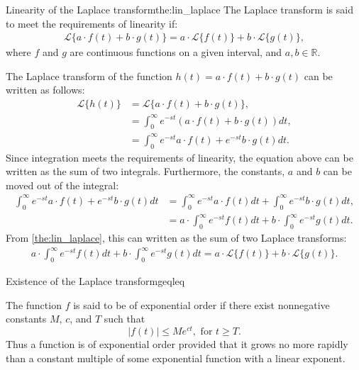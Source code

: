 \begin{theorem}{Linearity of the Laplace transform}{the:lin_laplace}
The Laplace transform is said to meet the requirements of linearity if:
\begin{align*}
\mathcal{L}\{a\cdot f(t)+b\cdot g(t)\}=a\cdot \mathcal{L}\{f(t)\}+b\cdot \mathcal{L}\{g(t)\},
\end{align*}
where $f$ and $g$ are continuous functions on a given interval, and $a, b \in \mathbb{R}$.
\end{theorem}
\begin{prof}{}{}
The Laplace transform of the function $h(t)=a\cdot f(t)+ b \cdot g(t)$ can be written as follows:
\begin{align*}
\mathcal{L}\{h(t)\}&=\mathcal{L}\{a\cdot f(t)+b\cdot g(t)\},
\\
&=\int_{0}^\infty e^{-st}\left(a\cdot f(t)+b\cdot g(t)\right)dt,
\\
&=\int_{0}^\infty e^{-st}a\cdot f(t)+e^{-st}b\cdot g(t)dt.
\end{align*}
Since integration meets the requirements of linearity, the equation above can be written as the sum of two integrals. Furthermore, the constants, $a$ and $b$ can be moved out of the integral:
\begin{align*}
\int_{0}^\infty e^{-st}a\cdot f(t)+e^{-st}b\cdot g(t)dt &=\int_{0}^\infty e^{-st}a\cdot f(t)dt+\int_{0}^\infty e^{-st}b\cdot g(t)dt,
\\
&= a\cdot \int_{0}^\infty e^{-st} f(t)dt+ b \cdot \int_{0}^\infty e^{-st} g(t)dt.
\end{align*}
From \cref{the:lin_laplace}, this can written as the sum of two Laplace transforms:
\begin{align*}
a\cdot \int_{0}^\infty e^{-st} f(t)dt+ b \cdot \int_{0}^\infty e^{-st} g(t)dt =a\cdot \mathcal{L}\{f(t)\}+b\cdot \mathcal{L}\{g(t)\}.
\end{align*}
\end{prof}
\begin{theorem}{Existence of the Laplace transform}{geqleq}

The function $f$ is said to be of exponential order if there exist nonnegative constants $M$, $c$, and $T$  such that $$|f(t)| \leq Me^{ct},    \text{   for } t \geq T.$$
Thus a function is of exponential order provided that it grows no more rapidly than a constant multiple of some exponential function with a linear exponent. \cite[p.~320]{diffandcomplex}
\end{theorem}
